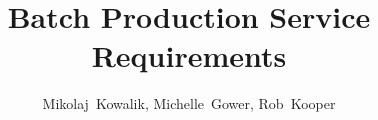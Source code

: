 \title{Batch Production Service Requirements}
\author{
Mikolaj~Kowalik,
Michelle~Gower,
Rob~Kooper
}


